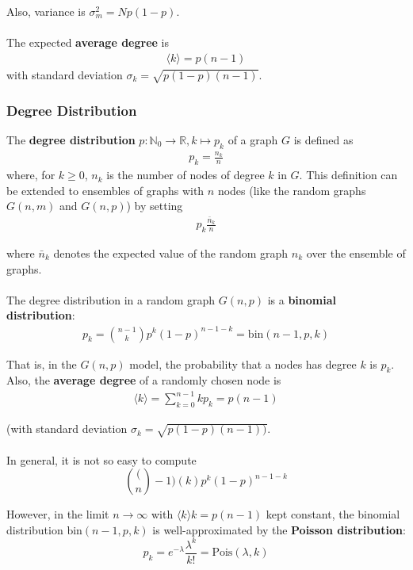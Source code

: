 \documentclass[a4paper,11pt]{article}
\begin{document}
Also, variance is $\sigma^2_m = Np(1-p)$.
\\\\
The expected \textbf{average degree} is
\begin{align*}
    \langle k\rangle = p(n-1)
\end{align*}
with standard deviation $\sigma_k = \sqrt{p(1-p) (n-1)}$.


\subsubsection{Degree Distribution}
The \textbf{degree distribution} $p: \mathbb{N}_0 \to \mathbb{R}, k \mapsto p_k$ of a graph $G$ is defined as 
\begin{align*}
    p_k = \frac{n_k}{n}
\end{align*}
where, for $k \geq 0$, $n_k$ is the number of nodes of degree $k$ in $G$.
This definition can be extended to ensembles of graphs with $n$ nodes (like the random graphs $G(n,m)$ and $G(n,p)$) by setting 
\begin{align*}
    p_k \frac{\bar{n}_k}{n}
\end{align*}

where $\bar{n}_k$ denotes the expected value of the random graph $n_k$ over the ensemble of graphs.
\\\\
The degree distribution in a random graph $G(n,p)$ is a \textbf{binomial distribution}:
\begin{align*}
    p_k = \binom{n-1}{k}p^k (1-p)^{n-1-k} = \text{bin}(n-1,p,k)
\end{align*}

That is, in the $G(n,p)$ model, the probability that a nodes has degree $k$ is $p_k$.
Also, the \textbf{average degree} of a randomly chosen node is
\begin{align*}
    \langle k \rangle = \sum^{n-1}_{k=0} kp_k = p(n-1)
\end{align*}

(with standard deviation $\sigma_k = \sqrt{p(1-p)(n-1))}$.
\\\\
In general, it is not so easy to compute
\[
    \binom(n-1)(k) p^k (1-p)^{n-1-k}
\]

However, in the limit $n \to \infty$ with $\langle k \rangle k = p(n-1)$ kept constant, the binomial distribution $\text{bin}(n-1,p,k)$ is well-approximated by the \textbf{Poisson distribution}:
\[
    p_k = e^{-\lambda} \frac{\lambda^k}{k!} = \text{Pois}(\lambda, k)
\]
\end{document}
